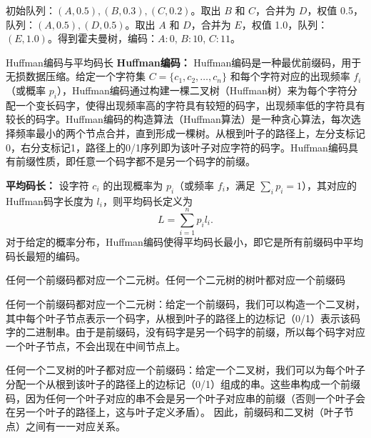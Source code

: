 初始队列：$(A,0.5), (B,0.3), (C,0.2)$。取出 $B$ 和 $C$，合并为 $D$，权值 0.5，队列：$(A,0.5), (D,0.5)$。取出 $A$ 和 $D$，合并为 $E$，权值 1.0，队列：$(E,1.0)$。得到霍夫曼树，编码：$A:0$, $B:10$, $C:11$。
\begin{definition}{Huffman编码与平均码长}{}
\textbf{Huffman编码：} Huffman编码是一种最优前缀码，用于无损数据压缩。给定一个字符集 $C = \{c_1, c_2, \dots, c_n\}$ 和每个字符对应的出现频率 $f_i$（或概率 $p_i$），Huffman编码通过构建一棵二叉树（Huffman树）来为每个字符分配一个变长码字，使得出现频率高的字符具有较短的码字，出现频率低的字符具有较长的码字。Huffman编码的构造算法（Huffman算法）是一种贪心算法，每次选择频率最小的两个节点合并，直到形成一棵树。从根到叶子的路径上，左分支标记0，右分支标记1，路径上的0/1序列即为该叶子对应字符的码字。Huffman编码具有前缀性质，即任意一个码字都不是另一个码字的前缀。

\textbf{平均码长：} 设字符 $c_i$ 的出现概率为 $p_i$（或频率 $f_i$，满足 $\sum_i p_i = 1$），其对应的Huffman码字长度为 $l_i$，则平均码长定义为
\[
L = \sum_{i=1}^n p_i l_i.
\]
对于给定的概率分布，Huffman编码使得平均码长最小，即它是所有前缀码中平均码长最短的编码。
\end{definition}
\begin{theorem}{}{}
任何一个前缀码都对应一个二元树。任何一个二元树的树叶都对应一个前缀码
\end{theorem}
任何一个前缀码都对应一个二元树：给定一个前缀码，我们可以构造一个二叉树，其中每个叶子节点表示一个码字，从根到叶子的路径上的边标记（0/1）表示该码字的二进制串。由于是前缀码，没有码字是另一个码字的前缀，所以每个码字对应一个叶子节点，不会出现在中间节点上。

任何一个二叉树的叶子都对应一个前缀码：给定一个二叉树，我们可以为每个叶子分配一个从根到该叶子的路径上的边标记（0/1）组成的串。这些串构成一个前缀码，因为任何一个叶子对应的串不会是另一个叶子对应串的前缀（否则一个叶子会在另一个叶子的路径上，这与叶子定义矛盾）。
因此，前缀码和二叉树（叶子节点）之间有一一对应关系。
